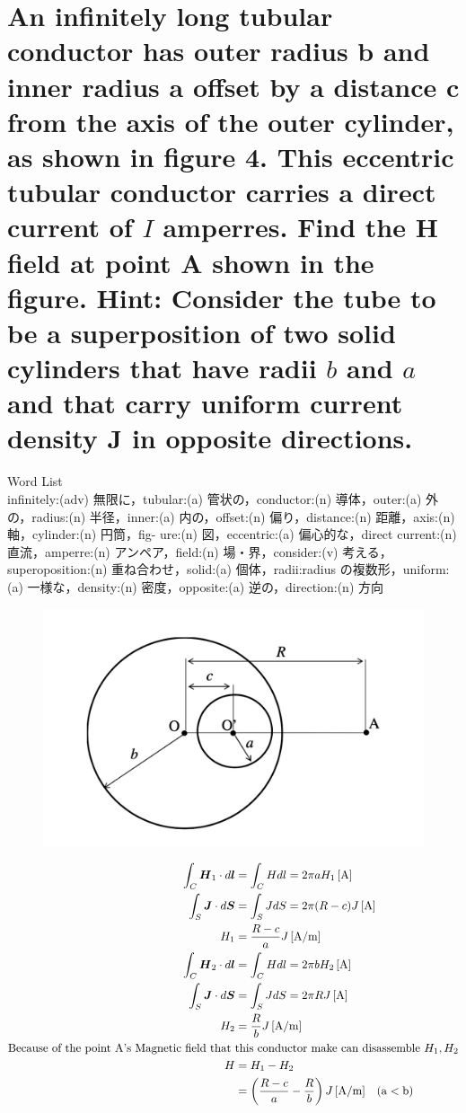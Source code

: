 \documentclass[dvipdfmx]{ujarticle}
\begin{document}
\section{An infinitely long tubular conductor has outer radius b and inner radius a offset by a distance c from the axis of the outer cylinder, as shown in figure 4. This eccentric tubular conductor carries a direct current of $I$ amperres. Find the H field at point A shown in the figure. Hint: Consider the tube to be a superposition of two solid cylinders that have radii $b$ and $a$ and that carry uniform current density J in opposite directions.}
Word List\\
infinitely:(adv) 無限に，tubular:(a) 管状の，conductor:(n) 導体，outer:(a) 外の，radius:(n) 半径，inner:(a) 内の，offset:(n) 偏り，distance:(n) 距離，axis:(n) 軸，cylinder:(n) 円筒，fig- ure:(n) 図，eccentric:(a) 偏心的な，direct current:(n) 直流，amperre:(n) アンペア，field:(n) 場・界，consider:(v) 考える，superoposition:(n) 重ね合わせ，solid:(a) 個体，radii:radius の複数形，uniform:(a) 一様な，density:(n) 密度，opposite:(a) 逆の，direction:(n) 方向
\begin{figure}[h]
	\centering
	\includegraphics[scale=0.35]{./fig/c.png}
	\caption{}
	\label{fig:c}
\end{figure}

\begin{align*}
	\int_{C}\boldsymbol{H}_{1}\cdot d\boldsymbol{l}&=\int_{C}Hdl=2\pi aH_{1}\,[\rm{A}]\\
	\int_{S}\boldsymbol{J}\cdot d\boldsymbol{S}&=\int_{S}JdS=2\pi (R-c)J\,[\rm{A}]\\
	H_{1}&=\frac{R-c}{a}J\,[\rm{A/m}]\\
	\int_{C}\boldsymbol{H}_{2}\cdot d\boldsymbol{l}&=\int_{C}Hdl=2\pi bH_{2}\,[\rm{A}]\\
	\int_{S}\boldsymbol{J}\cdot d\boldsymbol{S}&=\int_{S}JdS=2\pi RJ\,[\rm{A}]\\
	H_{2}&=\frac{R}{b}J\,[\rm{A/m}]\\
	\text{Because of the point A's Magnetic field that }&\text{this conductor make can disassemble }H_{1}, H_{2}\\
	H&=H_{1}-H_{2}\\
	&=\left(\frac{R-c}{a}-\frac{R}{b}\right)J\,[\rm{A/m}]\quad (a<b)
\end{align*}
\end{document}
